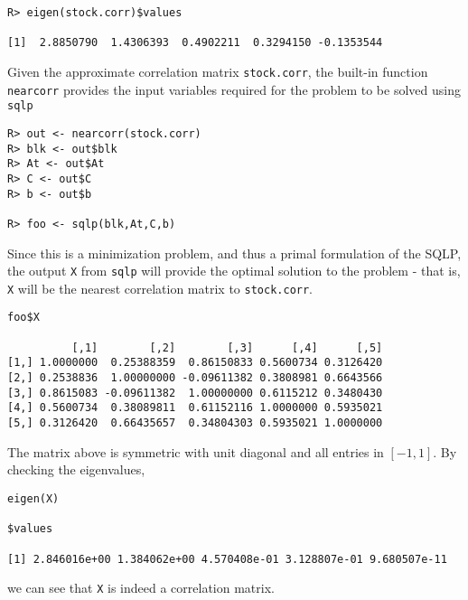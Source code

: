 \documentclass{article}
\begin{document}
\begin{verbatim}
R> eigen(stock.corr)$values

[1]  2.8850790  1.4306393  0.4902211  0.3294150 -0.1353544
\end{verbatim}

Given the approximate correlation matrix \verb!stock.corr!, the built-in function \verb!nearcorr! provides the input variables required for the problem to be solved using \verb!sqlp!

\begin{verbatim}
R> out <- nearcorr(stock.corr)
R> blk <- out$blk
R> At <- out$At
R> C <- out$C
R> b <- out$b

R> foo <- sqlp(blk,At,C,b)
\end{verbatim}

Since this is a minimization problem, and thus a primal formulation of the SQLP, the output \verb!X! from \verb!sqlp! will provide the optimal solution to the problem - that is, \verb!X! will be the nearest correlation matrix to \verb!stock.corr!.

\begin{verbatim}
foo$X

          [,1]        [,2]        [,3]      [,4]      [,5]
[1,] 1.0000000  0.25388359  0.86150833 0.5600734 0.3126420
[2,] 0.2538836  1.00000000 -0.09611382 0.3808981 0.6643566
[3,] 0.8615083 -0.09611382  1.00000000 0.6115212 0.3480430
[4,] 0.5600734  0.38089811  0.61152116 1.0000000 0.5935021
[5,] 0.3126420  0.66435657  0.34804303 0.5935021 1.0000000
\end{verbatim}

The matrix above is symmetric with unit diagonal and all entries in $[-1,1]$. By checking the eigenvalues,

\begin{verbatim}
eigen(X)

$values

[1] 2.846016e+00 1.384062e+00 4.570408e-01 3.128807e-01 9.680507e-11
\end{verbatim}

\noindent we can see that \verb!X! is indeed a correlation matrix.



\end{document}
